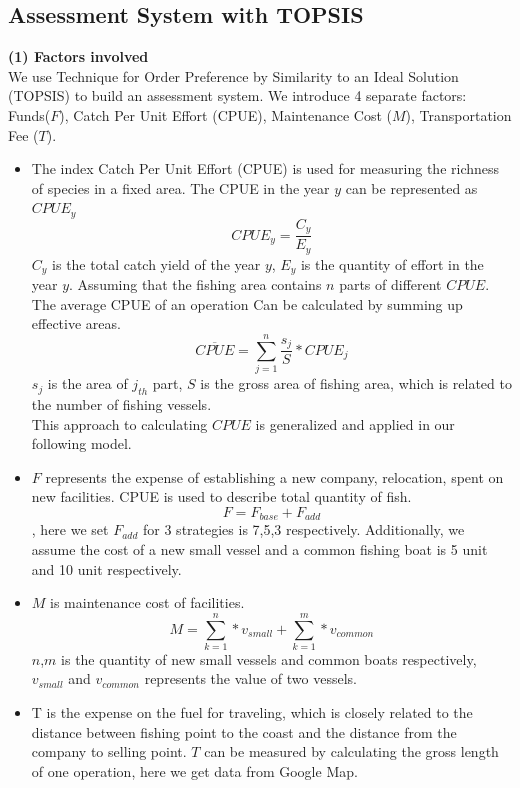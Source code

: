 \documentclass{mcmthesis}
\begin{document}
\subsection{Assessment System with TOPSIS}
\textbf{(1) Factors involved}\\
 \hspace*{2em} We use Technique for Order Preference by Similarity to an Ideal Solution (TOPSIS) to build an assessment system.
We introduce 4 separate factors: Funds($F$), Catch Per Unit Effort (CPUE), Maintenance Cost ($M$), Transportation Fee ($T$). 

\begin{itemize}
\item  The index Catch Per Unit Effort (CPUE) is used for measuring the richness of species in a fixed area. The CPUE in the year $y$ can be represented as $CPUE_{y}$
\begin{equation} CPUE_{y} = \frac{C_{y}}{E_{y}}\end{equation}
$C_{y}$ is the total catch yield of the year $y$, $E_{y}$ is the quantity of effort in the year $y$.
Assuming that the fishing area contains $n$ parts of different $CPUE$. The average CPUE of an operation 
Can be calculated by summing up effective areas.
\begin{equation}\overline{CPUE}=\sum_{j=1}^{n} \frac{s_{j}}{S}*CPUE_{j} \end{equation}
$s_{j}$ is the area of $j_{th}$ part, $S$ is the gross area of fishing area, which is related to the number of fishing vessels. \\
This approach to calculating $CPUE$ is generalized and applied in our following model. 
\item $F$ represents the expense of establishing a new company, relocation, spent on new facilities. CPUE is used to describe total quantity of fish.\begin{equation}F = F_{base} + F_{add}\end{equation}, here we set $F_{add}$ for 3 strategies is 7,5,3 respectively. Additionally, we assume the cost of a new small vessel and a common fishing boat is 5 unit and 10 unit respectively.\\
\item $M$ is maintenance cost of facilities.
\begin{equation}M = \sum_{k=1}^n * v_{small} + \sum_{k=1}^m * v_{common}\end{equation}
$n$,$m$ is the quantity of new small vessels and common boats respectively, $v_{small}$ and $v_{common}$ represents the value of two vessels.\\
\item T is the expense on the fuel for traveling, which is closely related to the distance between fishing point to the coast and the distance from the company to selling point. $T$ can be measured by calculating the gross length of one operation, here we get data from Google Map.\\
\end{itemize}
\end{document}
